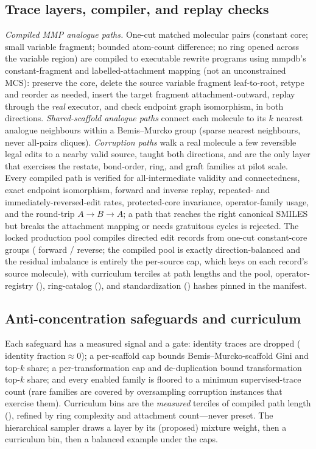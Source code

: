\subsection{Trace layers, compiler, and replay checks}
\emph{Compiled MMP analogue paths.} One-cut matched molecular pairs (constant core; small variable
fragment; bounded atom-count difference; no ring opened across the variable region) are compiled to
executable rewrite programs using mmpdb's constant-fragment and labelled-attachment mapping (not an
unconstrained MCS): preserve the core, delete the source variable fragment leaf-to-root, retype and
reorder as needed, insert the target fragment attachment-outward, replay through the \emph{real} executor,
and check endpoint graph isomorphism, in both directions. \emph{Shared-scaffold analogue paths} connect
each molecule to its $k$ nearest analogue neighbours within a Bemis--Murcko group (sparse nearest
neighbours, never all-pairs cliques). \emph{Corruption paths} walk a real molecule a few reversible legal
edits to a nearby valid source, taught both directions, and are the only layer that exercises the restate,
bond-order, ring, and graft families at pilot scale. Every compiled path is verified for
all-intermediate validity and connectedness, exact endpoint isomorphism, forward and inverse replay,
repeated- and immediately-reversed-edit rates, protected-core invariance, operator-family usage, and the
round-trip $A\!\to\!B\!\to\!A$; a path that reaches the right canonical SMILES but breaks the attachment
mapping or needs gratuitous cycles is rejected. The locked production pool compiles 
directed edit records from  one-cut constant-core groups
( forward /  reverse; the compiled pool is exactly
direction-balanced and the residual imbalance is entirely the per-source cap, which keys on each record's
source molecule), with curriculum terciles at path lengths  and the pool,
operator-registry (), ring-catalog (), and
standardization () hashes pinned in the manifest.

\subsection{Anti-concentration safeguards and curriculum}
Each safeguard has a measured signal and a gate: identity traces are dropped ($\text{identity fraction}
\approx0$); a per-scaffold cap bounds Bemis--Murcko-scaffold Gini and top-$k$ share; a per-transformation
cap and de-duplication bound transformation top-$k$ share; and every enabled family is floored to a
minimum supervised-trace count (rare families are covered by oversampling corruption instances that
exercise them). Curriculum bins are the \emph{measured} terciles of compiled path length
(), refined by ring complexity and attachment count---never preset. The
hierarchical sampler draws a layer by its (proposed) mixture weight, then a curriculum bin, then a
balanced example under the caps.

